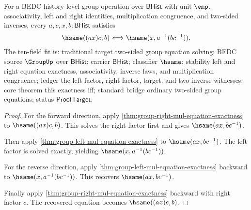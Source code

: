 \begin{theorem}
\label{thm:group-two-sided-mul-equation-exactness}
For a BEDC history-level group operation over $\mathsf{BHist}$ with unit
$\emp$, associativity, left and right identities, multiplication congruence,
and two-sided inverses, every $a,c,x,b:\mathsf{BHist}$ satisfies
$$
\hsame((a x)c,b) \Longleftrightarrow \hsame(x,a^{-1}(b c^{-1})).
$$
The ten-field fit is: traditional target two-sided group equation solving;
BEDC source $\GroupUp$ over $\mathsf{BHist}$; carrier $\mathsf{BHist}$;
classifier $\hsame$; stability left and right equation exactness,
associativity, inverse laws, and multiplication congruence; ledger the left
factor, right factor, target, and two inverse witnesses; core theorem this
exactness iff; standard bridge ordinary two-sided group equations; status
$\mathsf{ProofTarget}$.
\end{theorem}
\begin{proof}
For the forward direction, apply
\autoref{thm:group-right-mul-equation-exactness} to
$\hsame((a x)c,b)$. This solves the right factor first and gives
$\hsame(a x,b c^{-1})$.

Then apply \autoref{thm:group-left-mul-equation-exactness} to
$\hsame(a x,b c^{-1})$. The left factor is solved exactly, yielding
$\hsame(x,a^{-1}(b c^{-1}))$.

For the reverse direction, apply
\autoref{thm:group-left-mul-equation-exactness} backward to
$\hsame(x,a^{-1}(b c^{-1}))$. This recovers $\hsame(a x,b c^{-1})$.

Finally apply \autoref{thm:group-right-mul-equation-exactness} backward with
right factor $c$. The recovered equation becomes $\hsame((a x)c,b)$.
\end{proof}

